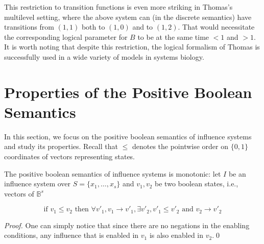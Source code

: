 \documentclass{llncs}
\newcommand{\lra}{\longrightarrow}
\begin{document}
This restriction to transition functions is even more striking in Thomas's multilevel setting, where the above
system can (in the discrete semantics) have transitions from $(1,1)$ both to
$(1,0)$ and to $(1,2)$. That would necessitate the corresponding logical
parameter for $B$ to be at the same time $<1$ and $>1$.
It is worth noting that despite this restriction, the logical formalism of Thomas is successfully used in a wide variety of models \cite{TFFT16bi,GCBRKT13plos,NCCT10pcb,GCT08bi} in systems biology.



\section{Properties of the Positive Boolean Semantics}

In this section, we focus on the positive boolean semantics of influence systems and study its
properties. 
Recall that $\leq$ denotes the
pointwise order on $\{0,1\}$ coordinates of vectors representing states.

\begin{proposition}[Monotonicity]
   \label{prop:mono}
   The positive boolean semantics of influence systems is monotonic: let $I$ be an
   influence system over $S=\{x_1,\dots,x_s\}$ and $v_1, v_2$ be two boolean
   states, i.e., vectors of $\mathbb{B}^s$

   \noindent
   \begin{minipage}[c]{0.8\textwidth}
      \[\text{if } v_1\leq v_2\text{ then }\forall v'_1, v_1\lra
      v'_1,\exists v'_2, v'_1\leq v'_2 \text{ and } v_2\lra v'_2\]
   \end{minipage}%
   \begin{minipage}[c]{0.2\textwidth}
   \end{minipage}

\end{proposition}

\begin{proof}

   One can simply notice that since there are no
   negations in the enabling conditions, any influence that is enabled in $v_1$ is also
   enabled in $v_2$.\qed

\end{proof}
\end{document}
